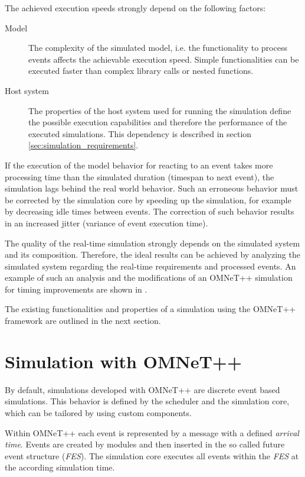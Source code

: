 The achieved execution speeds strongly depend on the following factors:
\begin{description}
    \item[Model] The complexity of the simulated model, i.e. the functionality to process events affects the achievable execution speed.
                 Simple functionalities can be executed faster than complex library calls or nested functions.
    \item[Host system] The properties of the host system used for running the simulation define the possible execution capabilities and therefore the performance of the executed simulations.
                       This dependency is described in section \ref{sec:simulation_requirements}.
\end{description}

If the execution of the model behavior for reacting to an event takes more processing time than the simulated duration (timespan to next event), the simulation lags behind the real world behavior.
Such an erroneous behavior must be corrected by the simulation core by speeding up the simulation, for example by decreasing idle times between events.
The correction of such behavior results in an increased jitter (variance of event execution time).
\cite[section III.B]{belanger_what_2010}

The quality of the real-time simulation strongly depends on the simulated system and its composition.
Therefore, the ideal results can be achieved by analyzing the simulated system regarding the real-time requirements and processed events.
An example of such an analysis and the modifications of an OMNeT++ simulation for timing improvements are shown in \cite{scussel_improvements_2015}.

The existing functionalities and properties of a simulation using the OMNeT++ framework are outlined in the next section.

\section{Simulation with OMNeT++}
\label{sec:simulation_omnet}
By default, simulations developed with OMNeT++ are discrete event based simulations.
This behavior is defined by the scheduler and the simulation core, which can be tailored by using custom components. \cite[section 4.1]{omnet_manual}

Within OMNeT++ each event is represented by a message with a defined \emph{arrival time}.
Events are created by modules and then inserted in the so called future event structure (\emph{FES}).
The simulation core executes all events within the \emph{FES} at the according simulation time.

